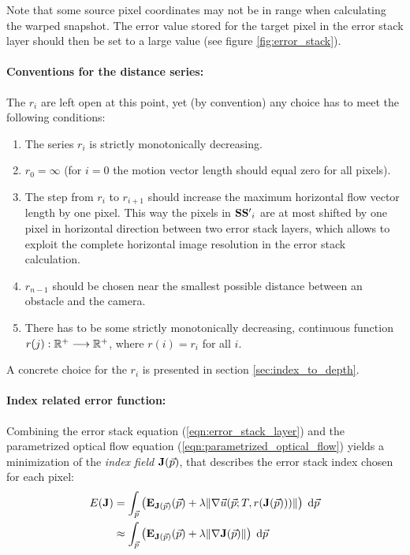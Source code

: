 Note that some source pixel coordinates may not be in range when calculating the warped snapshot. The error value stored for the target pixel in the error stack layer should then be set to a large value (see figure \ref{fig:error_stack}).

\paragraph{Conventions for the distance series:} The $r_i$ are left open at this point, yet (by convention) any choice has to meet the following conditions:
\begin{enumerate}[1.]
 \item The series $r_i$ is strictly monotonically decreasing.
 \item $r_0 = \infty$ (for $i = 0$ the motion vector length should equal zero for all pixels).
 \item The step from $r_i$ to $r_{i + 1}$ should increase the maximum horizontal flow vector length by one pixel. This way the pixels in $\mathbf{SS'}_i$ are at most shifted by one pixel in horizontal direction between two error stack layers, which allows to exploit the complete horizontal image resolution in the error stack calculation.
 \item $r_{n - 1}$ should be chosen near the smallest possible distance between an obstacle and the camera.
 \item There has to be some strictly monotonically decreasing, continuous function $r(j) : {\mathbb{R}}^+ \longrightarrow {\mathbb{R}}^+$, where $r(i) = r_i$ for all $i$.
\end{enumerate}
A concrete choice for the $r_i$ is presented in section \ref{sec:index_to_depth}.

\paragraph{Index related error function:} Combining the error stack equation (\ref{eqn:error_stack_layer}) and the parametrized optical flow equation (\ref{eqn:parametrized_optical_flow}) yields a minimization of the \textit{index field} $\img{J}(\vec p)$, that describes the error stack index chosen for each pixel:
\begin{align}
 E(\img{J}) &= \int_{\vec p} \left( \img{E}_{\img{J}(\vec p)}(\vec p) + \lambda \| \nabla \vec u(\vec p; T, r(\img{J}(\vec p))) \| \right) \; \mathrm{d}\vec p \nonumber \\
 &\approx \int_{\vec p} \left( \img{E}_{\img{J}(\vec p)}(\vec p) + \lambda \| \nabla \img{J}(\vec p) \| \right) \; \mathrm{d}\vec p \label{eqn:global_min_index}
\end{align}


